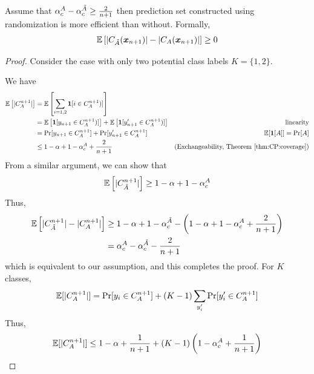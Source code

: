 \begin{theorem}
Assume that $\alpha_c^A - \alpha_c^{\Tilde{A}} \geq \frac{2}{n+1}$ then prediction set constructed using randomization is more efficient than without. Formally, 
\[
    \mathbb{E}\left[|C_{\Tilde{A}}({\bm{x}}_{n+1})| - |C_A({\bm{x}}_{n+1})|\right]  \geq 0
\]   
\label{them:APS:efficiency}
\end{theorem}
\begin{proof}
Consider the case with only two potential class labels $K = \{1, 2\}$. 

We have
\begin{align*}
    \mathbb{E}\left[|C_{A}^{n+1}|\right] &= \mathbb{E}\left[\sum\limits_{i=1, 2}\bm{1}[i \in C_{A}^{n+1})]\right] \\
                                 &= \mathbb{E}\left[\bm{1}[y_{n+1} \in C_{A}^{n+1})]\right] + \mathbb{E}\left[\bm{1}[y'_{n+1} \in C_{A}^{n+1})]\right]  & \text{linearity}\\
                                 &= \Pr[y_{n+1} \in C_{A}^{n+1}] + \Pr[y'_{n+1} \in C_{A}^{n+1}] & \text{$\mathbb{E}[\bm{1}[A]] = \Pr[A]$}\\
                                 &\leq 1 - \alpha + 1 - \alpha_c^A + \frac{2}{n+1} & \text{(Exchangeability, Theorem~\ref{thm:CP:coverage})} 
\end{align*}
From a similar argument, we can show that 
\[
    \mathbb{E}\left[|C_{\Tilde{A}}^{n+1}|\right] \geq 1 - \alpha + 1 - \alpha_c^A
\]
Thus, 
\begin{align}
    \mathbb{E}\left[|C_{\Tilde{A}}^{n+1}| - |C_{A}^{n+1}|\right] &\geq 1 - \alpha + 1 - \alpha_c^{\Tilde{A}} - \left(1 - \alpha + 1 - \alpha_c^A + \frac{2}{n+1} \right)\\
    &= \alpha_c^A - \alpha_c^{\Tilde{A}} - \frac{2}{n+1}
\end{align}
which is equivalent to our assumption, and this completes the proof.
For $K$ classes, 
\begin{align*}
    \mathbb{E}[\lvert C_{A}^{n+1}\rvert] &= \Pr[y_i \in C_{A}^{n+1}] + (K-1)\sum\limits_{y'_i} \Pr[y'_i \in C_{A}^{n+1}] \\
\end{align*}
Thus, 
\begin{align*}
    \E\brackets{\abs{C_{A}^{n+1}}}&\leq 1 - \alpha + \frac{1}{n+1} + (K-1)\left(1 - \alpha_c^A + \frac{1}{n+1}\right) \\

\end{align*}
\end{proof}
